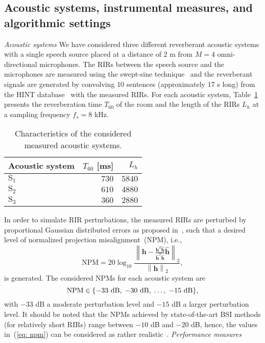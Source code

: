 \documentclass[twocolumn]{bmcart}%
\begin{document}
\subsection{Acoustic systems, instrumental measures, and algorithmic settings}
\label{sec: acsys}
\vskip 5pt
\textit{Acoustic systems} 
\vskip 5pt
We have considered three different reverberant acoustic systems with a single speech source placed at a distance of $2$ m from $M=4$ omni-directional microphones.
The RIRs between the speech source and the microphones are measured using the swept-sine technique~\cite{Farina_2000} and the reverberant signals are generated by convolving $10$ sentences (approximately $17$ s long) from the HINT database~\cite{Nilsson_JASA_1994} with the measured RIRs.
For each acoustic system, Table~\ref{tbl: ac_sys} presents the reverberation time $T_{60}$ of the room and the length of the RIRs $L_h$ at a sampling frequency $f_{s} = 8$ kHz.
\begin{table}[t!]
\begin{center}
  \caption{Characteristics of the considered measured acoustic systems.}
  \label{tbl: ac_sys}
  \begin{tabularx}{\linewidth}{Xrr}
    \toprule
    Acoustic system & $T_{60}$ [ms] & $L_h$  \\
    \midrule
    $\text{S}_1$ & $730$ &  $5840$ \\
    $\text{S}_2$ & $610$ & $4880$ \\
    $\text{S}_3$ & $360$ & $2880$ \\
    \bottomrule
  \end{tabularx}
\end{center}
\end{table}
In order to simulate RIR perturbations, the measured RIRs are perturbed by proportional Gaussian distributed errors as proposed in~\cite{Zhang_HINDAWI_2008}, such that a desired level of normalized projection misalignment~(NPM), i.e.,
\begin{equation}
{\text{NPM}} = 20 \log_{10} \frac{ \left\| \mathbf{h} - \frac{\mathbf{h}^T\hat{\mathbf{h}}}{\hat{\mathbf{h}}^T\hat{\mathbf{h}}}\hat{\mathbf{h}}\right\|_2}{\left\| \mathbf{h} \right\|_2},
\end{equation}
is generated.
The considered NPMs for each acoustic system are
\begin{equation}
\label{eq: npm}
{\text{NPM}} \in \{ -33~{\rm dB}, \; -30~{\rm dB}, \; \ldots, \; -15~{\rm dB} \},
\end{equation}
with $-33$ dB a moderate perturbation level and $-15$ dB a larger perturbation level.
It should be noted that the NPMs achieved by state-of-the-art BSI methods (for relatively short RIRs) range between $-10$ dB and $-20$ dB, hence, the values in~(\ref{eq: npm}) can be considered as rather realistic~\cite{Hu_EUSIPCO_2015}.
\vskip 5pt
\textit{Performance measures} 
\vskip 5pt
\end{document}
